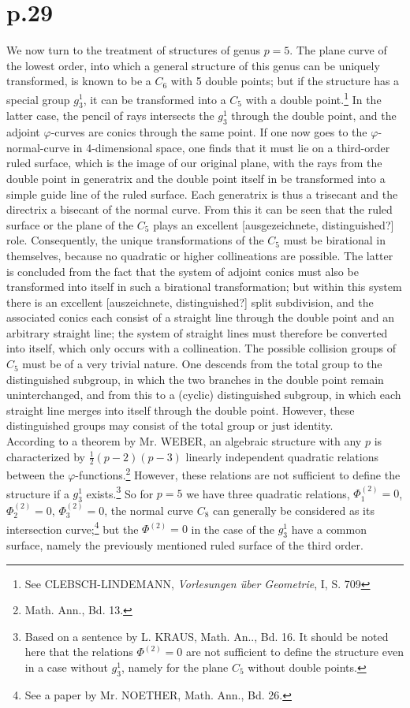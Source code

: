 \documentclass[leqno]{article}
\begin{document}
\section{p.29}
We now turn to the treatment of structures of genus $p=5$. The plane curve of the lowest order, into which a general structure of this genus can be uniquely transformed, is known to be a $C_6$ with 5 double points; but if the structure has a special group $g_3^1$, it can be transformed into a $C_5$ with a double point.\footnote{See CLEBSCH-LINDEMANN, \textit{Vorlesungen \"uber Geometrie}, I, S. 709} In the latter case, the pencil of rays intersects the $g_3^1$ through the double point, and the adjoint $\varphi$-curves are conics through the same point. If one now goes to the $\varphi$-normal-curve in 4-dimensional space, one finds that it must lie on a third-order ruled surface, which is the image of our original plane, with the rays from the double point in generatrix and the double point itself in be transformed into a simple guide line of the ruled surface. Each generatrix is thus a trisecant and the directrix a bisecant of the normal curve. From this it can be seen that the ruled surface or the plane of the $C_5$ plays an excellent [ausgezeichnete, distinguished?] role. Consequently, the unique transformations of the $C_5$ must be birational in themselves, because no quadratic or higher collineations are possible. The latter is concluded from the fact that the system of adjoint conics must also be transformed into itself in such a birational transformation; but within this system there is an excellent [auszeichnete, distinguished?] split subdivision, and the associated conics each consist of a straight line through the double point and an arbitrary straight line; the system of straight lines must therefore be converted into itself, which only occurs with a collineation. The possible collision groups of $C_5$ must be of a very trivial nature. One descends from the total group to the distinguished subgroup, in which the two branches in the double point remain uninterchanged, and from this to a (cyclic) distinguished subgroup, in which each straight line merges into itself through the double point. However, these distinguished groups may consist of the total group or just identity. \\
According to a theorem by Mr. WEBER, an algebraic structure with any $p$ is characterized by $\frac{1}{2}(p-2)(p-3)$ linearly independent quadratic relations between the $\varphi$-functions.\footnote{Math. Ann., Bd. 13.} However, these relations are not sufficient to define the structure if a $g_3^1$ exists.\footnote{Based on a sentence by L. KRAUS, Math. An.., Bd. 16. It should be noted here that the relations $\Phi^{(2)}=0$ are not sufficient to define the structure even in a case without $g_3^1$, namely for the plane $C_5$ without double points.} So for $p=5$ we have three quadratic relations, $\Phi_1^{(2)}=0$, $\Phi_2^{(2)}=0$, $\Phi_3^{(2)}=0 $, the normal curve $C_8$ can generally be considered as its intersection curve;\footnote{See a paper by Mr. NOETHER, Math. Ann., Bd. 26.} but the $\Phi^{(2)}=0$ in the case of the $g_3^1$ have a common surface, namely the previously mentioned ruled surface of the third order.
\end{document}
